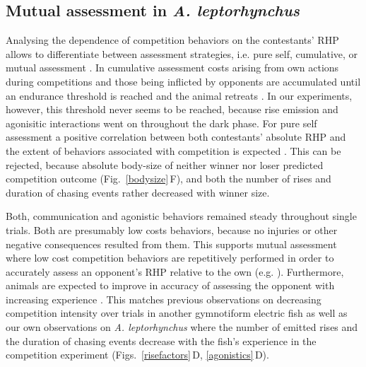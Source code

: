 \documentclass[vruler,JEB]{COB}%
\newcommand{\lepto}{\textit{A. leptorhynchus}}
\newcommand{\panel}[1]{\textsf{#1}}
\newcommand{\subfref}[2]{\textup{\ref{#1}}\,\panel{#2}}
\newcommand{\Fig}{Fig.}
\newcommand{\Subfigref}[2]{\Fig~\subfref{#1}{#2}}
\newcommand{\Figsb}{Figs.}
\newcommand{\Subfigsrefb}[2]{\Figsb~\subfref{#1}{#2}}
\begin{document}


\subsection{Mutual assessment in \lepto{}}

Analysing the dependence of competition behaviors on the contestants' RHP allows to differentiate between assessment strategies, i.e. pure self, cumulative, or mutual assessment \citep{ArnottElwood2009}. In cumulative assessment costs arising from own actions during competitions and those being inflicted by opponents are accumulated until an endurance threshold is reached and the animal retreats \citep{Payne1998}. In our experiments, however, this threshold never seems to be reached, because rise emission and agonisitic interactions went on throughout the dark phase. For pure self assessment a positive correlation between both contestants' absolute RHP and the extent of behaviors associated with competition is expected \citep{Taylor2001}. This can be rejected, because absolute body-size of neither winner nor loser predicted competition outcome (\Subfigref{bodysize}{F}), and both the number of rises and duration of chasing events rather decreased with winner size.

Both, communication and agonistic behaviors remained steady throughout single trials. Both are presumably low costs behaviors, because no injuries or other negative consequences resulted from them. This supports mutual assessment where low cost competition behaviors are repetitively performed in order to accurately assess an opponent's RHP relative to the own (e.g. \citealp{Cluttonbrock1979}). Furthermore, animals are expected to improve in accuracy of assessing the opponent with increasing experience \citep{Enquist1990, Grosenick2007}. This matches previous observations on decreasing competition intensity over trials in another gymnotiform electric fish \citep{Westby1970} as well as our own observations on \lepto{} where the number of emitted rises and the duration of chasing events decrease with the fish's experience in the competition experiment (\Subfigsrefb{risefactors}{D}, \subfref{agonistics}{D}).
\end{document}
